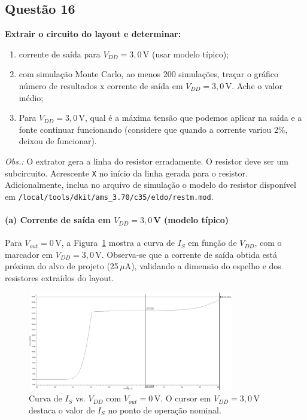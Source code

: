 \documentclass[12pt,a4paper]{article}
\begin{document}
\subsection*{Questão 16}
\begin{BoxQ}
    \textbf{Extrair o circuito do layout e determinar:}
\begin{enumerate}
    \item corrente de saída para $V_{DD} = 3{,}0$\,V (usar modelo típico);
    \item com simulação Monte Carlo, ao menos 200 simulações, traçar o gráfico número de resultados x corrente de saída em $V_{DD} = 3{,}0$\,V. Ache o valor médio;
    \item Para $V_{DD} = 3{,}0$\,V, qual é a máxima tensão que podemos aplicar na saída e a fonte continuar funcionando (considere que quando a corrente variou 2\%, deixou de funcionar).
\end{enumerate}
    	\textit{Obs.:} O extrator gera a linha do resistor erradamente. O resistor deve ser um subcircuito. Acrescente \texttt{X} no início da linha gerada para o resistor. Adicionalmente, inclua no arquivo de simulação o modelo do resistor disponível em \nolinkurl{/local/tools/dkit/ams_3.70/c35/eldo/restm.mod}.
\end{BoxQ}


\paragraph{(a) Corrente de saída em $V_{DD}=3{,}0$\,V (modelo típico)}
Para $V_{out}=0$\,V, a Figura~\ref{fig:q16a} mostra a curva de $I_S$ em função de $V_{DD}$, com o marcador em $V_{DD}=3{,}0$\,V. Observa-se que a corrente de saída obtida está próxima do alvo de projeto (25\,$\mu$A), validando a dimensão do espelho e dos resistores extraídos do layout.

\begin{figure}[H]
    \centering
    \includegraphics[width=0.8\textwidth]{images/16.1.png}
    \caption{Curva de $I_S$ vs. $V_{DD}$ com $V_{out}=0$\,V. O cursor em $V_{DD}=3{,}0$\,V destaca o valor de $I_S$ no ponto de operação nominal.}
    \label{fig:q16a}
\end{figure}
\end{document}
